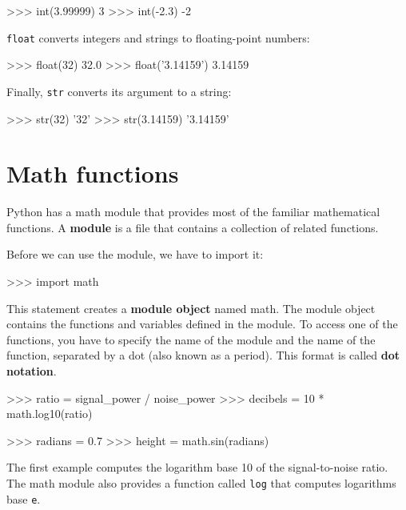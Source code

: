 \beforeverb
\begin{pyinterpreter}
>>> int(3.99999)
3
>>> int(-2.3)
-2
\end{pyinterpreter}
\afterverb
%
{\tt float} converts integers and strings to floating-point
numbers:


\beforeverb
\begin{pyinterpreter}
>>> float(32)
32.0
>>> float('3.14159')
3.14159
\end{pyinterpreter}
\afterverb
%
Finally, {\tt str} converts its argument to a string:


\beforeverb
\begin{pyinterpreter}
>>> str(32)
'32'
>>> str(3.14159)
'3.14159'
\end{pyinterpreter}
\afterverb
%



\section{Math functions}

Python has a math module that provides most of the familiar
mathematical functions.  A {\bf module} is a file that contains a
collection of related functions.


Before we can use the module, we have to import it:

\beforeverb
\begin{pyinterpreter}
>>> import math
\end{pyinterpreter}
\afterverb
%
This statement creates a {\bf module object} named math.
%
The module object contains the functions and variables defined in the
module.  To access one of the functions, you have to specify the name
of the module and the name of the function, separated by a dot (also
known as a period).  This format is called {\bf dot notation}.


\beforeverb
\begin{pyinterpreter}
>>> ratio = signal_power / noise_power
>>> decibels = 10 * math.log10(ratio)

>>> radians = 0.7
>>> height = math.sin(radians)
\end{pyinterpreter}
\afterverb
%
The first example computes the logarithm base 10 of the
signal-to-noise ratio.  The math module also provides a
function called {\tt log} that computes logarithms base {\tt e}.

